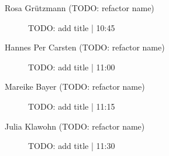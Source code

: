 \begin{symposium}
\begin{description}
                \item [Rosa Grützmann (TODO: refactor name)] TODO: add title \textcolor{mygray}{ | 10:45}    
                
                \item [Hannes Per Carsten (TODO: refactor name)] TODO: add title \textcolor{mygray}{ | 11:00}    
                
                \item [Mareike Bayer (TODO: refactor name)] TODO: add title \textcolor{mygray}{ | 11:15}    
                
                \item [Julia Klawohn  (TODO: refactor name)] TODO: add title \textcolor{mygray}{ | 11:30}    
                
            \end{description} 
            \end{symposium}
            